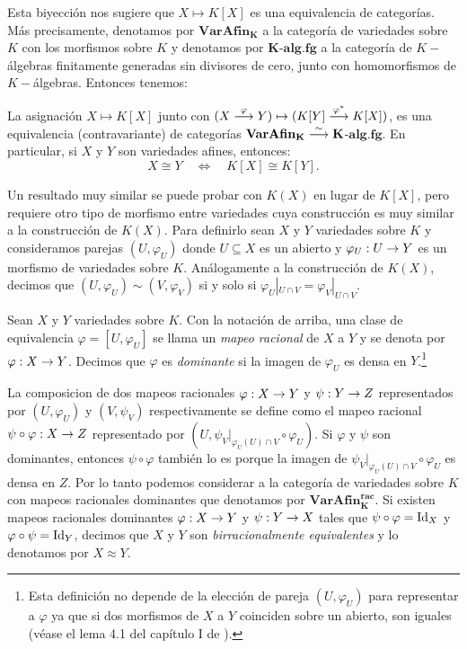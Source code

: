 Esta biyección nos sugiere que $X\mapsto K[X]$ es una equivalencia de categorías. Más precisamente, denotamos por $\mathbf{VarAfin_K}$ a la categoría de variedades sobre $K$ con los morfismos sobre $K$ y denotamos por $\mathbf{K}$-$\mathbf{alg.fg}$ a la categoría de $K-$álgebras finitamente generadas sin divisores de cero, junto con homomorfismos de $K-$álgebras. Entonces tenemos:

\begin{thm}\label{thm:equiv-afin-k-alg}
	La asignación $X\mapsto K[X]$ junto con $(X\overset{\varphi}{\longrightarrow}Y)\mapsto(K[Y]\overset{\varphi^*}{\longrightarrow}K[X])$, es una equivalencia (contravariante) de categorías $\mathbf{VarAfin_K} \overset{\sim}{\longrightarrow}\mathbf{K}$-$\mathbf{alg.fg}$. En particular, si $X$ y $Y$ son variedades afines, entonces:
	\[
		X\cong Y\quad\iff\quad K[X]\cong K[Y].
	\]
\end{thm}

Un resultado muy similar se puede probar con $K(X)$ en lugar de $K[X]$, pero requiere otro tipo de morfismo entre variedades cuya construcción es muy similar a la construcción de $K(X)$. Para definirlo sean $X$ y $Y$ variedades sobre $K$ y consideramos parejas $(U,\varphi_U)$ donde $U\subseteq X$ es un abierto y $\varphi_U:U\rightarrow Y$ es un morfismo de variedades sobre $K$. Análogamente a la construcción de $K(X)$, decimos que $(U,\varphi_U)\sim(V,\varphi_V)$ si y solo si $\varphi_U|_{U\cap V}=\varphi_V|_{U\cap V}$.

\begin{defin}
Sean $X$ y $Y$ variedades sobre $K$. Con la notación de arriba, una clase de equivalencia $\varphi=[U,\varphi_U]$ se llama un \emph{mapeo racional} de $X$ a $Y$ y se denota por $\varphi:X\rightarrow Y$. Decimos que $\varphi$ es \emph{dominante} si la imagen de $\varphi_U$ es densa en $Y$.\footnote{Esta definición no depende de la elección de pareja $(U,\varphi_U)$ para representar a $\varphi$ ya que si dos morfismos de $X$ a $Y$ coinciden sobre un abierto, son iguales (véase el lema 4.1 del capítulo I de \cite{HartshorneAG}).}
\end{defin}

\begin{nota}
La composicion de dos mapeos racionales $\varphi:X\rightarrow Y$ y $\psi:Y\rightarrow Z$ representados por $(U,\varphi_U)$ y $(V,\psi_V)$ respectivamente se define como el mapeo racional $\psi\circ \varphi: X\rightarrow Z$ representado por $(U,\psi_V|_{\varphi_U(U)\cap V}\circ\varphi_U)$. Si $\varphi$ y $\psi$ son dominantes, entonces $\psi\circ \varphi$ también lo es porque la imagen de $\psi_V|_{\varphi_U(U)\cap V}\circ\varphi_U$ es densa en $Z$. Por lo tanto podemos considerar a la categoría de variedades sobre $K$ con mapeos racionales dominantes que denotamos por $\mathbf{VarAfin_K^{rac}}$. Si existen mapeos racionales dominantes $\varphi:X\rightarrow Y$ y $\psi:Y\rightarrow X$ tales que $\psi\circ\varphi=\mathrm{Id}_X$ y $\varphi\circ\psi=\mathrm{Id}_Y$, decimos que $X$ y $Y$ son \emph{birracionalmente equivalentes} y lo denotamos por $X \approx Y$.
\end{nota}

